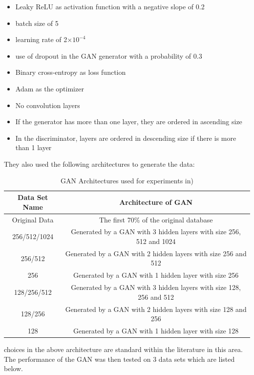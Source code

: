\begin{itemize}
    \item Leaky ReLU as activation function with a negative slope of 0.2
    \item batch size of 5
    \item learning rate of 2$\times10^{-4}$
    \item use of dropout in the GAN generator with a probability of 0.3
    \item Binary cross-entropy as loss function
    \item Adam as the optimizer
    \item No convolution layers
    \item If the generator has more than one layer, they are ordered in ascending size
    \item In the discriminator, layers are ordered in descending size if there is more than 1 layer
\end{itemize}\cite{litReviewGanDataAugmentation}
They also used the following architectures to generate the data:
\begin{table}[H]
    \centering
    \begin{tabular}{|c|c|}
    \hline
         Data Set Name
         & Architecture of GAN\\
         \hline
         Original Data & The first 70\% of the original database\\
         256/512/1024 & Generated by a GAN with 3 hidden layers with size 256, 512 and 1024\\
         256/512 & Generated by a GAN with 2 hidden layers with size 256 and 512\\
         256 & Generated by a GAN with 1 hidden layer with size 256\\
         128/256/512 & Generated by a GAN with 3 hidden layers with size 128, 256 and 512\\
         128/256 & Generated by a GAN with 2 hidden layers with size 128 and 256\\
         128 & Generated by a GAN with 1 hidden layer with size 128\\
         \hline
    \end{tabular}
    \caption{GAN Architectures used for experiments in\cite{litReviewGanDataAugmentation})}
    \label{tab:GAN architecture(Data Augmentation using GANs paper)}
\end{table}
choices in the above architecture are standard within the literature in this area.  The performance of the GAN was then tested on 3 data sets which are listed below.
